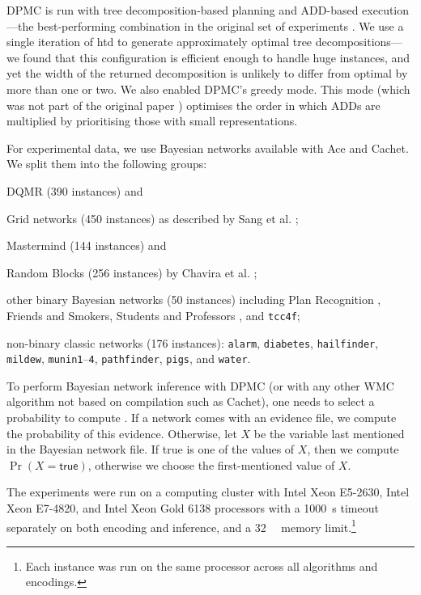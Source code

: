 \textsf{DPMC} is run with tree decomposition-based planning and ADD-based
execution---the best-performing combination in the original set of experiments
\cite{DBLP:conf/cp/DudekPV20}. We use a single iteration of \textsf{htd}
\cite{DBLP:conf/cpaior/AbseherMW17} to generate approximately optimal tree
decompositions---we found that this configuration is efficient enough to handle
huge instances, and yet the width of the returned decomposition is unlikely to
differ from optimal by more than one or two. We also enabled \textsf{DPMC}'s
greedy mode. This mode (which was not part of the original paper
\cite{DBLP:conf/cp/DudekPV20}) optimises the order in which ADDs are multiplied
by prioritising those with small representations.

For experimental data, we use Bayesian networks available with \textsf{Ace} and
\textsf{Cachet}. We split them into the following groups:
\begin{itemize*}
\item DQMR (390 instances) and
\item Grid networks (450 instances) as described by Sang et al.
  \cite{DBLP:conf/aaai/SangBK05};
\item Mastermind (144 instances) and
\item Random Blocks (256 instances) by Chavira et al.
  \cite{DBLP:journals/ijar/ChaviraDJ06};
\item other binary Bayesian networks (50 instances) including Plan Recognition
  \cite{DBLP:conf/aaai/SangBK05}, Friends and Smokers, Students and Professors
  \cite{DBLP:journals/ijar/ChaviraDJ06}, and \texttt{tcc4f};
\item non-binary classic networks (176 instances): \texttt{alarm},
  \texttt{diabetes}, \texttt{hailfinder}, \texttt{mildew},
  \texttt{munin1}--\texttt{4}, \texttt{pathfinder}, \texttt{pigs}, and
  \texttt{water}.
\end{itemize*}

To perform Bayesian network inference with \textsf{DPMC} (or with any
other WMC algorithm not based on compilation such as \textsf{Cachet}), one
needs to select a probability to compute
\cite{DBLP:conf/cp/DudekPV20,DBLP:conf/sat/SangBBKP04}. If a network comes
with an evidence file, we compute the probability of this evidence. Otherwise,
let $X$ be the variable last mentioned in the Bayesian network file. If
\textsf{true} is one of the values of $X$, then we compute $\Pr(X =
\textsf{true})$, otherwise we choose the first-mentioned value of $X$.

The experiments were run on a computing cluster with Intel Xeon E5-2630,
Intel Xeon E7-4820, and Intel Xeon Gold 6138 processors with a
\SI{1000}{\second} timeout separately on both encoding and inference, and a
\SI{32}{\gibi\byte} memory limit.\footnote{Each instance was run on the same
  processor across all algorithms and encodings.}


